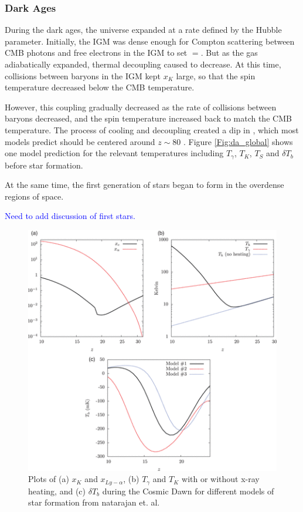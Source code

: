 \subsubsection{Dark Ages}
During the dark ages, the universe expanded at a rate defined by the Hubble parameter. Initially, the IGM was dense enough for Compton scattering between CMB photons and free electrons in the IGM to set \tk$=$\tg. But as the gas adiabatically expanded, thermal decoupling caused \tk to decrease. At this time, collisions between baryons in the IGM kept $x_K$ large, so that the spin temperature decreased below the CMB temperature. 

However, this coupling gradually decreased as the rate of collisions between baryons decreased, and the spin temperature increased back to match the CMB temperature. The process of cooling and decoupling created a dip in \ts, which most models predict should be centered around $z \sim 80 $ \cite{furlanetto_2006}. Figure \ref{Fig:da_global} shows one model prediction for the relevant temperatures including $T_\gamma$, $T_K$, $T_S$ and $\delta T_b$ before star formation. 

At the same time, the first generation of stars began to form in the overdense regions of space. 

\textcolor{blue}{Need to add discussion of first stars.}

\begin{figure}[htb]
\begin{center}
\includegraphics[width=0.95\linewidth]{Introduction/figures/ts_evolution.png}
\caption{Plots of (a) $x_K$ and $x_{Ly-\alpha}$, (b) $T_\gamma$ and $T_K$ with or without x-ray heating, and (c) $\delta T_b$ during the Cosmic Dawn for different models of star formation from natarajan et. al. \cite{natarajan_2014}}
\label{Fig:cd_global}
\end{center}
\end{figure}

